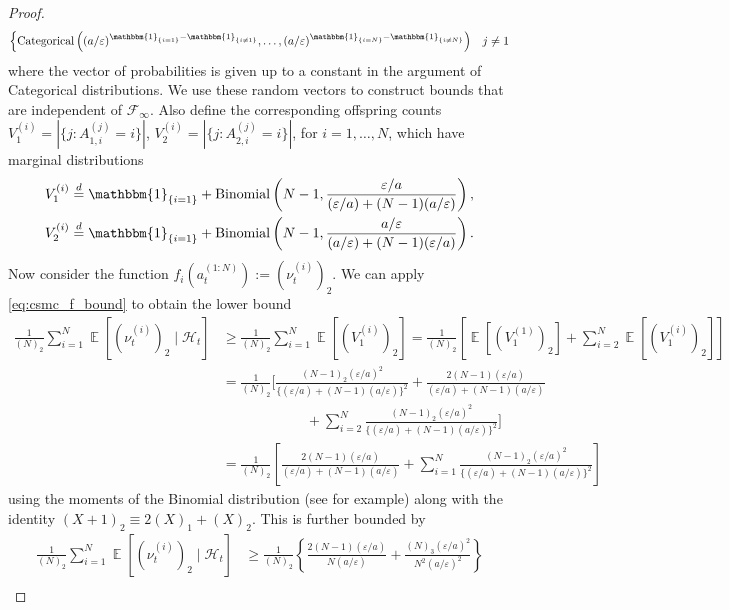 \documentclass{article} %
\theoremstyle{definition}
\DeclareMathOperator{\E}{\mathbb{E}}
\newcommand{\1}[1]{\mathbbm{1}_{\{#1\}}}
\begin{document}
\begin{proof}
\begin{align*}
\begin{cases}
\operatorname{Categorical}\left( (a/\varepsilon)^{\1{i=1} -\1{i\neq 1}} ,\dots, (a/\varepsilon)^{\1{i=N} -\1{i\neq N}} \right) & j\neq 1
 \end{cases}
\end{align*}
where the vector of probabilities is given up to a constant in the argument of Categorical distributions.
We use these random vectors to construct bounds that are independent of $\mathcal{F}_\infty$.
Also define the corresponding offspring counts $V_1^{(i)} = |\{j: A_{1,i}^{(j)}=i\}|$, $V_2^{(i)} = |\{j: A_{2,i}^{(j)}=i\}|$, for $i=1,\dots,N$, which have marginal distributions
\begin{align*}
& V_1^{(i)} \overset{d}{=} \1{i=1} + \operatorname{Binomial}\left(N-1, \frac{\varepsilon/a}{(\varepsilon/a) + (N-1)(a/\varepsilon)} \right) , \\
& V_2^{(i)} \overset{d}{=} \1{i=1} + \operatorname{Binomial}\left( N-1, \frac{a/\varepsilon}{(a/\varepsilon) + (N-1)(\varepsilon/a)} \right) .
\end{align*}
Now consider the function $f_i(a_t^{(1:N)}) := (\nu_t^{(i)})_2$. We can apply \eqref{eq:csmc_f_bound} to obtain the lower bound
\begin{align*}
\frac{1}{(N)_2} \sum_{i=1}^N \E[ (\nu_t^{(i)})_2 \mid \mathcal{H}_t ]
&\geq \frac{1}{(N)_2} \sum_{i=1}^N \E[ (V_1^{(i)})_2 ]
=  \frac{1}{(N)_2} \left[ \E[ (V_1^{(1)})_2 ] + \sum_{i=2}^N \E[ (V_1^{(i)})_2 ] \right] \\
&= \frac{1}{(N)_2} \Bigg[ \frac{(N-1)_2 (\varepsilon/a)^2}{\{(\varepsilon/a) + (N-1)(a/\varepsilon)\}^2} + \frac{2(N-1)(\varepsilon/a)}{(\varepsilon/a) + (N-1)(a/\varepsilon)}  \\
&\qquad\qquad\qquad + \sum_{i=2}^N \frac{(N-1)_2 (\varepsilon/a)^2}{\{(\varepsilon/a) + (N-1)(a/\varepsilon)\}^2} \Bigg] \\
&= \frac{1}{(N)_2} \left[ \frac{2(N-1)(\varepsilon/a)}{(\varepsilon/a) + (N-1)(a/\varepsilon)} + \sum_{i=1}^N \frac{(N-1)_2 (\varepsilon/a)^2}{\{(\varepsilon/a) + (N-1)(a/\varepsilon)\}^2} \right]
\end{align*}
using the moments of the Binomial distribution (see \cite{mosimann1962} for example) along with the identity $(X+1)_2 \equiv 2(X)_1 +(X)_2$.
This is further bounded by
\begin{align}
\frac{1}{(N)_2} \sum_{i=1}^N \E[ (\nu_t^{(i)})_2 \mid \mathcal{H}_t ]
&\geq \frac{1}{(N)_2} \left\{ \frac{2(N-1)(\varepsilon/a)}{N(a/\varepsilon)} + \frac{(N)_3 (\varepsilon/a)^2}{N^2(a/\varepsilon)^2} \right\} \nonumber\\

\end{align}
\end{proof}
\end{document}
